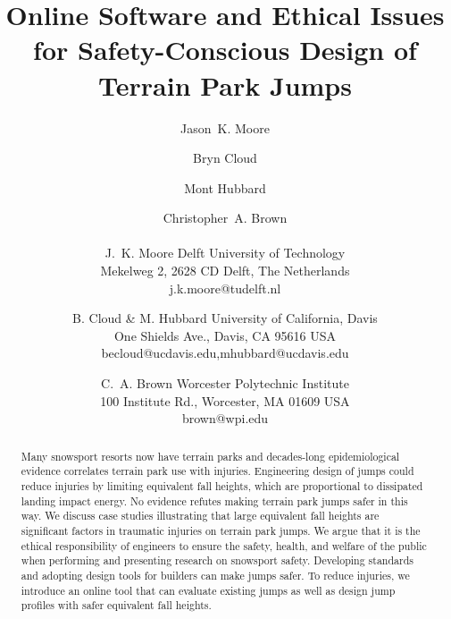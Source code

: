 \documentclass{article}
\begin{document}
\title{Online Software and Ethical Issues for Safety-Conscious Design of Terrain Park Jumps}

\author{
  Jason~K. Moore \and
  Bryn Cloud \and
  Mont Hubbard \and
  Christopher~A. Brown \\\\
  J.~K. Moore
  Delft University of Technology\\
  Mekelweg 2, 2628 CD Delft, The Netherlands\\
  j.k.moore@tudelft.nl
  \and
  B. Cloud \& M. Hubbard
  University of California, Davis\\
  One Shields Ave., Davis, CA 95616 USA\\
  becloud@ucdavis.edu,mhubbard@ucdavis.edu
  \and
  C.~A. Brown
  Worcester Polytechnic Institute\\
  100 Institute Rd., Worcester, MA 01609 USA\\
  brown@wpi.edu
}

\maketitle

\begin{abstract}
  Many snowsport resorts now have terrain parks and decades-long
  epidemiological evidence correlates terrain park use with injuries.
  Engineering design of jumps could reduce injuries by limiting equivalent fall
  heights, which are proportional to dissipated landing impact energy.  No
  evidence refutes making terrain park jumps safer in this way. We discuss case
  studies illustrating that large equivalent fall heights are significant
  factors in traumatic injuries on terrain park jumps. We argue that it is the
  ethical responsibility of engineers to ensure the safety, health, and welfare
  of the public when performing and presenting research on snowsport safety.
  Developing standards and adopting design tools for builders can make jumps
  safer. To reduce injuries, we introduce an online tool that can evaluate existing jumps as well as design jump profiles
  with safer equivalent fall heights.
\end{abstract}
\end{document}
